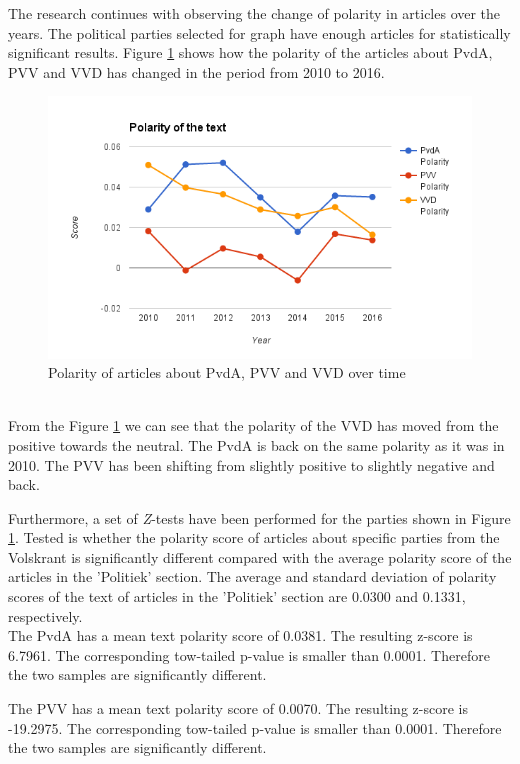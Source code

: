 The research continues with observing the change of polarity in articles over the years. The political parties selected for graph have enough articles for statistically significant results. Figure \ref{fig:polarity} shows how the polarity of the articles about PvdA, PVV and VVD has changed in the period from 2010 to 2016.
    \begin{figure}[ht]
        \centering
        \includegraphics[scale=0.40]{Graphs/Polarity}
        \caption{Polarity of articles about PvdA, PVV and VVD over time}
        \label{fig:polarity}
    \end{figure}
    \\
From the Figure \ref{fig:polarity} we can see that the polarity of the VVD has moved from the positive towards the neutral. The PvdA is back on the same polarity as it was in 2010. The PVV has been shifting from slightly positive to slightly negative and back. 

Furthermore, a set of {\it Z}-tests have been performed for the parties shown in Figure \ref{fig:polarity}. Tested is whether the polarity score of articles about specific parties from the Volskrant is significantly different compared with the average polarity score of the articles in the 'Politiek' section. 
The average and standard deviation of polarity scores of the text of articles in the 'Politiek' section are 0.0300 and 0.1331, respectively. \\

The PvdA has a mean text polarity score of 0.0381. The resulting z-score is 6.7961. The corresponding tow-tailed p-value is smaller than 0.0001. Therefore the two samples are significantly different.

The PVV has a mean text polarity score of 0.0070. The resulting z-score is -19.2975. The corresponding tow-tailed p-value is smaller than 0.0001. Therefore the two samples are significantly different.

